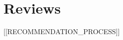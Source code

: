 \documentclass[a4paper]{article}
\begin{document}
\beginingpreprint

\begin{center}\Large\bfseries
    \chapter{Reviews}
\end{center}

[[RECOMMENDATION_PROCESS]]
\end{document}

